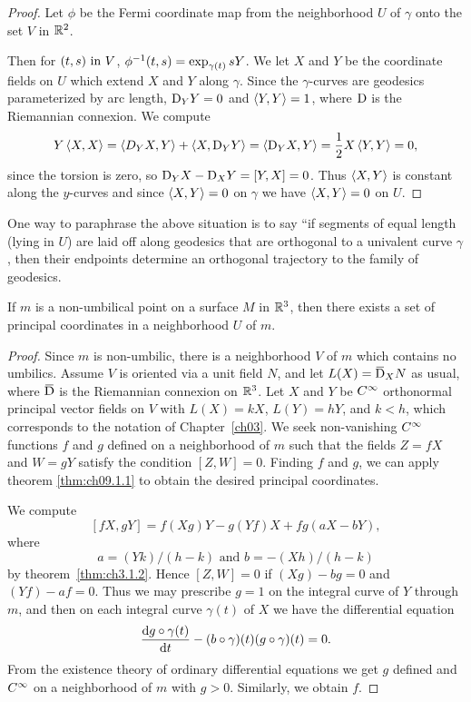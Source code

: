 \documentclass[../main]{subfiles}
\begin{document}
\begin{proof}
    Let $\phi$ be the Fermi coordinate map from the neighborhood $U$ of $\gamma$ onto the set $V$ in $\mathbb{R}^2$.

    Then for $(t, s) \text{ in } V$, $\phi^{-1}(t, s) = \exp_{\gamma(t)}sY$. We let $X$ and $Y$ be the coordinate fields on $U$ which extend $X$ and $Y$ along $\gamma$. Since the $\gamma$-curves are geodesics parameterized by arc length, $\mathrm{D}_Y Y = 0$ and $\left\langle Y,Y\right\rangle = 1$, where $\mathrm{D}$ is the Riemannian connexion. We compute \[Y\left\langle X,X\right\rangle = \left\langle D_Y X,Y\right\rangle + \left\langle X,\mathrm{D}_Y Y\right\rangle = \left\langle\mathrm{D}_Y X,Y\right\rangle = \frac{1}{2}X\left\langle Y,Y\right\rangle = 0,\] since the torsion is zero, so $\mathrm{D}_Y X - \mathrm{D}_X Y = [Y, X] = 0$. Thus $\left\langle X,Y\right\rangle$ is constant along the $y$-curves and since $\left\langle X,Y\right\rangle = 0$ on $\gamma$ we have $\left\langle X,Y\right\rangle = 0$ on $U$.
\end{proof}



One way to paraphrase the above situation is to say ``if segments of equal length (lying in $U$) are laid off along geodesics that are orthogonal to a univalent curve $\gamma$, then their endpoints determine an orthogonal trajectory to the family of geodesics.



\begin{theorem} \label{thm:ch9.5.2}
    If $m$ is a non-umbilical point on a surface $M$ in $\mathbb{R}^3$, then there exists a set of principal coordinates in a neighborhood $U$ of $m$.
\end{theorem}

\begin{proof}
    Since $m$ is non-umbilic, there is a neighborhood $V$ of $m$ which contains no umbilics. Assume $V$ is oriented via a unit field $N$, and let $L(X) = \covariant_X N$ as usual, where $\covariant$ is the Riemannian connexion on $\mathbb{R}^3$. Let $X$ and $Y$ be $C^\infty$ orthonormal principal vector fields on $V$ with $L(X) = kX$, $L(Y) = hY$, and $k < h$, which corresponds to the notation of Chapter~\ref{ch03}. We seek non-vanishing $C^\infty$ functions $f$ and $g$ defined on a neighborhood of $m$ such that the fields $Z = fX$ and $W = gY$ satisfy the condition $[Z, W] = 0$. Finding $f$ and $g$, we can apply theorem \ref{thm:ch09.1.1} to obtain the desired principal coordinates.

    We compute \[[fX, gY] = f(Xg)Y - g(Yf)X + fg(aX - bY),\] where \[a = (Yk)/(h - k)\text{ and }b = -(Xh)/(h - k)\]by theorem~\ref{thm:ch3.1.2}. Hence $[Z, W] = 0$ if $(Xg) - bg = 0$ and $(Yf) - af = 0$. Thus we may prescribe $g = 1$ on the integral curve of $Y$ through $m$, and then on each integral curve $\gamma(t)$ of $X$ we have the differential equation
    \[ \dfrac{\mathrm{d}g \circ \gamma(t)}{\mathrm{d}t} - (b \circ \gamma)(t)(g \circ \gamma)(t) = 0\text{.} \]
    From the existence theory of ordinary differential equations we get $g$ defined and $C^\infty$ on a neighborhood of $m$ with $g > 0$. Similarly, we obtain $f$.
\end{proof}
\end{document}
